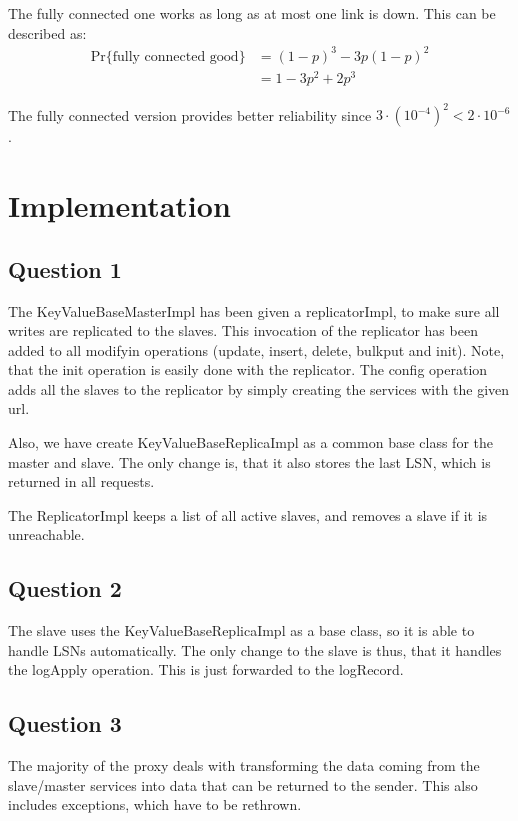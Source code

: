 \documentclass[a4paper,final]{article}
\newcommand{\mono}[1]{{\ttfamily#1}}
\begin{document}
The fully connected one works as long as at most one link is down. This can
be described as:
\begin{align*}
    \text{Pr}\{\text{fully connected good}\} &= (1-p)^3 - 3p(1-p)^2 \\
                                            &= 1 - 3p^2 + 2p^3
\end{align*}

The fully connected version provides better reliability since
$3\cdot (10^{-4})^2 < 2\cdot 10^{-6}$.


\section{Implementation}

\subsection*{Question 1}
The \mono{KeyValueBaseMasterImpl} has been given a \mono{replicatorImpl}, to
make sure all writes are replicated to the slaves. This invocation of the
replicator has been added to all modifyin operations (update, insert, delete,
bulkput and init). Note, that the init operation is easily done with the
replicator. The \mono{config} operation adds all the slaves to the replicator
by simply creating the services with the given url.

Also, we have create \mono{KeyValueBaseReplicaImpl} as a common base class
for the master and slave. The only change is, that it also stores the last
LSN, which is returned in all requests.

The \mono{ReplicatorImpl} keeps a list of all active slaves, and removes a
slave if it is unreachable.

\subsection*{Question 2}
The slave uses the \mono{KeyValueBaseReplicaImpl} as a base class, so it is
able to handle LSNs automatically. The only change to the slave is thus, that
it handles the logApply operation. This is just forwarded to the
\mono{logRecord}.

\subsection*{Question 3}
The majority of the proxy deals with transforming the data coming from the
slave/master services into data that can be returned to the sender. This
also includes exceptions, which have to be rethrown.
\end{document}
